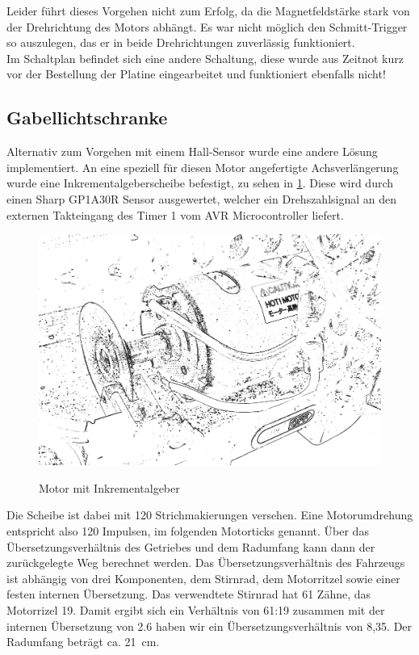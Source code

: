 Leider führt dieses Vorgehen nicht zum Erfolg, da die Magnetfeldstärke stark von der Drehrichtung des Motors abhängt. Es war nicht möglich
den Schmitt-Trigger so auszulegen, das er in beide Drehrichtungen zuverlässig funktioniert.\\

Im Schaltplan befindet sich eine andere Schaltung, diese wurde aus Zeitnot kurz vor der Bestellung der Platine eingearbeitet und funktioniert ebenfalls nicht!

\subsection{Gabellichtschranke}

Alternativ zum Vorgehen mit einem Hall-Sensor wurde eine andere Lösung implementiert. An eine speziell für diesen Motor angefertigte Achsverlängerung wurde eine Inkrementalgeberscheibe befestigt, zu sehen in \cref{fig:gabellichtschranke}. 
Diese wird durch einen Sharp GP1A30R Sensor ausgewertet, welcher ein Drehszahlsignal an den externen Takteingang des Timer 1 vom AVR Microcontroller liefert.
\begin{figure}[H]
\centering
\includegraphics[width=.8\textwidth]{odometrie.png}\\
\caption{Motor mit Inkrementalgeber}%
\label{fig:gabellichtschranke}
\end{figure}

Die Scheibe ist dabei mit 120 Strichmakierungen versehen. Eine Motorumdrehung entspricht also 120 Impulsen, im folgenden Motorticks genannt. Über das Übersetzungsverhältnis des Getriebes und dem Radumfang kann dann 
der zurückgelegte Weg berechnet werden. Das Übersetzungsverhältnis des Fahrzeugs ist abhängig von drei Komponenten, dem Stirnrad, dem Motorritzel sowie einer festen internen Übersetzung. Das verwendtete Stirnrad hat
61 Zähne, das Motorrizel 19. Damit ergibt sich ein Verhältnis von 61:19 zusammen mit der internen Übersetzung von 2.6  
haben wir ein Übersetzungsverhältnis von 8,35. Der Radumfang beträgt ca. \SI{21}{\cm}.

